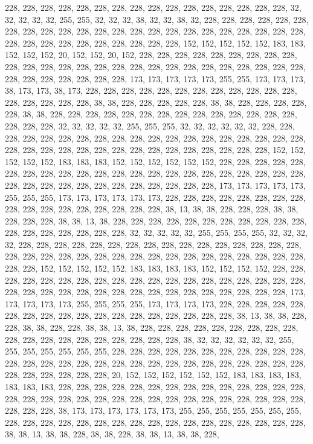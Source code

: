 {	228, 228, 228, 228, 228, 228, 228, 228, 228, 228, 228, 228, 228, 228, 228, 228, 32,  32,  32,  32,  32,  255, 255, 32,  32,  32,  38,  32,  32,  38,  32,  228, 228, 228, 228, 228, 228, 228, 228, 228, 228, 228, 228, 228, 228, 228, 228, 228, 228, 228, 228, 228, 228, 228, 228, 228, 228, 228, 228, 228, 228, 228, 228, 228, 152, 152, 152, 152, 152, 183, 183, 152, 152, 152, 20,  152, 152, 20,  152, 228, 228, 228, 228, 228, 228, 228, 228, 228, 228, 228, 228, 228, 228, 228, 228, 228, 228, 228, 228, 228, 228, 228, 228, 228, 228, 228, 228, 228, 228, 228, 228, 228, 173, 173, 173, 173, 173, 255, 255, 173, 173, 173, 38,  173, 173, 38,  173, 228, 228, 228, 228, 228, 228, 228, 228, 228, 228, 228, 228, 228, 228, 228, 228, 228, 38,  38,  228, 228, 228, 228, 228, 38,  38,  228, 228, 228, 228, 228, 38,  38,  
	228, 228, 228, 228, 228, 228, 228, 228, 228, 228, 228, 228, 228, 228, 228, 228, 228, 32,  32,  32,  32,  32,  255, 255, 255, 32,  32,  32,  32,  32,  32,  228, 228, 228, 228, 228, 228, 228, 228, 228, 228, 228, 228, 228, 228, 228, 228, 228, 228, 228, 228, 228, 228, 228, 228, 228, 228, 228, 228, 228, 228, 228, 228, 228, 228, 152, 152, 152, 152, 152, 183, 183, 183, 152, 152, 152, 152, 152, 152, 228, 228, 228, 228, 228, 228, 228, 228, 228, 228, 228, 228, 228, 228, 228, 228, 228, 228, 228, 228, 228, 228, 228, 228, 228, 228, 228, 228, 228, 228, 228, 228, 228, 228, 173, 173, 173, 173, 173, 255, 255, 255, 173, 173, 173, 173, 173, 173, 228, 228, 228, 228, 228, 228, 228, 228, 228, 228, 228, 228, 228, 228, 228, 228, 228, 38,  13,  38,  38,  228, 228, 228, 38,  38,  228, 228, 228, 38,  38,  13,  38,  
	228, 228, 228, 228, 228, 228, 228, 228, 228, 228, 228, 228, 228, 228, 228, 228, 228, 228, 32,  32,  32,  32,  32,  255, 255, 255, 255, 32,  32,  32,  32,  228, 228, 228, 228, 228, 228, 228, 228, 228, 228, 228, 228, 228, 228, 228, 228, 228, 228, 228, 228, 228, 228, 228, 228, 228, 228, 228, 228, 228, 228, 228, 228, 228, 228, 228, 152, 152, 152, 152, 152, 183, 183, 183, 183, 152, 152, 152, 152, 228, 228, 228, 228, 228, 228, 228, 228, 228, 228, 228, 228, 228, 228, 228, 228, 228, 228, 228, 228, 228, 228, 228, 228, 228, 228, 228, 228, 228, 228, 228, 228, 228, 228, 228, 173, 173, 173, 173, 173, 255, 255, 255, 255, 173, 173, 173, 173, 228, 228, 228, 228, 228, 228, 228, 228, 228, 228, 228, 228, 228, 228, 228, 228, 228, 228, 38,  13,  38,  38,  228, 228, 38,  38,  228, 228, 38,  38,  13,  38,  228, 
	228, 228, 228, 228, 228, 228, 228, 228, 228, 228, 228, 228, 228, 228, 228, 228, 228, 228, 38,  32,  32,  32,  32,  32,  32,  255, 255, 255, 255, 255, 255, 255, 228, 228, 228, 228, 228, 228, 228, 228, 228, 228, 228, 228, 228, 228, 228, 228, 228, 228, 228, 228, 228, 228, 228, 228, 228, 228, 228, 228, 228, 228, 228, 228, 228, 228, 20,  152, 152, 152, 152, 152, 152, 183, 183, 183, 183, 183, 183, 183, 228, 228, 228, 228, 228, 228, 228, 228, 228, 228, 228, 228, 228, 228, 228, 228, 228, 228, 228, 228, 228, 228, 228, 228, 228, 228, 228, 228, 228, 228, 228, 228, 228, 228, 38,  173, 173, 173, 173, 173, 173, 255, 255, 255, 255, 255, 255, 255, 228, 228, 228, 228, 228, 228, 228, 228, 228, 228, 228, 228, 228, 228, 228, 228, 228, 38,  38,  13,  38,  38,  228, 38,  38,  228, 38,  38,  13,  38,  38,  228, 
}
